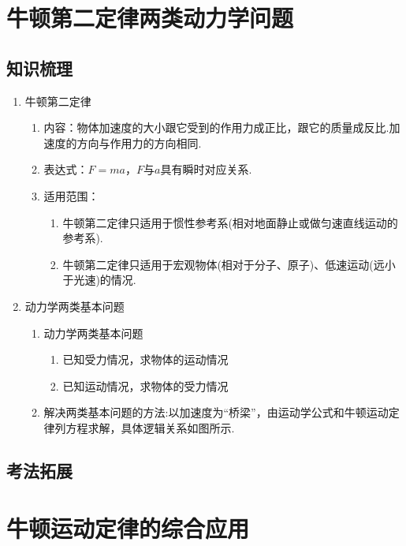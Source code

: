 \documentclass[cn,11pt]{elegantbook}
\begin{document}
   \section{牛顿第二定律两类动力学问题}
      \subsection{知识梳理}
      \begin{enumerate}
         \item 牛顿第二定律
         \begin{enumerate}
            \item 内容：物体加速度的大小跟它受到的作用力成正比，跟它的质量成反比.加速度的方向与作用力的方向相同.
            \item 表达式：$F=m a$，$F$与$a$具有瞬时对应关系.
            \item 适用范围：
            \begin{enumerate}
               \item 牛顿第二定律只适用于惯性参考系(相对地面静止或做匀速直线运动的参考系).
               \item 牛顿第二定律只适用于宏观物体(相对于分子、原子)、低速运动(远小于光速)的情况.
            \end{enumerate}
         \end{enumerate}
         \item 动力学两类基本问题
         \begin{enumerate}
            \item 动力学两类基本问题
            \begin{enumerate}
               \item 已知受力情况，求物体的运动情况
               \item 已知运动情况，求物体的受力情况
            \end{enumerate}
            \item 解决两类基本问题的方法:以加速度为“桥梁”，由运动学公式和牛顿运动定律列方程求解，具体逻辑关系如图所示.
         \end{enumerate}
      \end{enumerate}
      \subsection{考法拓展}

   \section{牛顿运动定律的综合应用}
\end{document}
